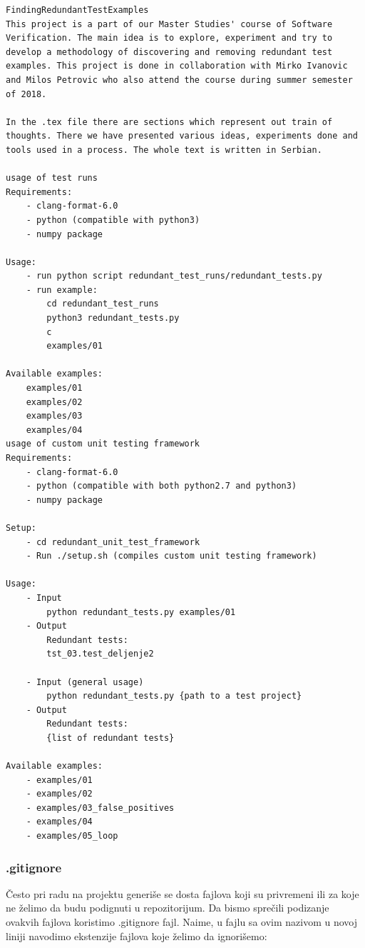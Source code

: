 \begin{lstlisting}[backgroundcolor = \color{lightgray}, breaklines=true]
FindingRedundantTestExamples
This project is a part of our Master Studies' course of Software Verification. The main idea is to explore, experiment and try to develop a methodology of discovering and removing redundant test examples. This project is done in collaboration with Mirko Ivanovic and Milos Petrovic who also attend the course during summer semester of 2018.

In the .tex file there are sections which represent out train of thoughts. There we have presented various ideas, experiments done and tools used in a process. The whole text is written in Serbian.

usage of test runs
Requirements:
    - clang-format-6.0
    - python (compatible with python3)
    - numpy package

Usage:
    - run python script redundant_test_runs/redundant_tests.py
	- run example:
        cd redundant_test_runs
        python3 redundant_tests.py
        c
        examples/01
		
Available examples:
    examples/01
    examples/02
    examples/03
    examples/04
usage of custom unit testing framework
Requirements:
    - clang-format-6.0
    - python (compatible with both python2.7 and python3)
    - numpy package

Setup:
    - cd redundant_unit_test_framework
    - Run ./setup.sh (compiles custom unit testing framework)

Usage:
    - Input
        python redundant_tests.py examples/01 
    - Output
        Redundant tests: 
        tst_03.test_deljenje2
		
    - Input (general usage)
        python redundant_tests.py {path to a test project} 
    - Output
        Redundant tests:
        {list of redundant tests}
        
Available examples:
    - examples/01
    - examples/02
    - examples/03_false_positives
    - examples/04
    - examples/05_loop
\end{lstlisting}

\subsubsection{.gitignore}
Često pri radu na projektu generiše se dosta fajlova koji su privremeni ili za koje ne želimo da budu podignuti u repozitorijum. Da bismo sprečili podizanje ovakvih fajlova koristimo .gitignore fajl. Naime, u fajlu sa ovim nazivom u novoj liniji navodimo ekstenzije fajlova koje želimo da ignorišemo:

